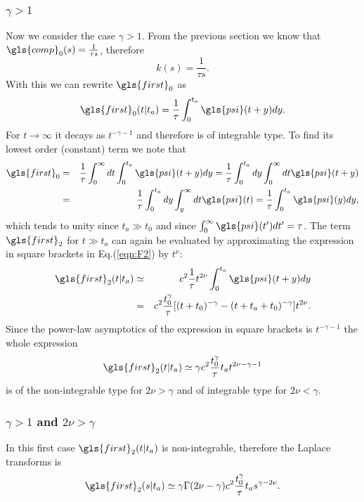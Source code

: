 \subsubsection{$\gamma > 1$}
Now we consider the case $\gamma > 1$. From the previous section we know that $\gls{comp}_0(s)=\frac{1}{\tau s}$, therefore
\begin{equation}
k(s) = \frac{1}{\tau s} . \label{eqn:kGammaLarge}
\end{equation}
With this we can rewrite $\gls{first}_0$ as 
\begin{equation}
 \gls{first}_0(t|t_a) = \frac{1}{\tau} \int_0^{t_a} \gls{psi}(t+y)dy.
\end{equation}
For $t \to \infty$ it decays as $t^{-\gamma-1}$ and therefore is of integrable type. To find its lowest order (constant) term we note that
\begin{eqnarray}
 \gls{first}_0 &=& \frac{1}{\tau} \int_0^\infty dt \int_0^{t_a} \gls{psi}(t+y)dy = \frac{1}{\tau} \int_0^{t_a} dy \int_0^\infty dt \gls{psi}(t+y) \nonumber \\
 &=& \frac{1}{\tau} \int_0^{t_a} dy \int_y^\infty dt \gls{psi}(t) = \frac{1}{\tau} \int^{t_a}_0 \gls{psi}(y) dy,
\end{eqnarray}
which tends to unity since $t_a \gg t_0$ and since $\int_0^\infty \gls{psi}(t') dt' = \tau$. 
The term $\gls{first}_2$ for $t \gg t_a$ can again be 
evaluated by approximating the expression in square brackets in Eq.(\ref{eqn:F2}) by $t^\nu$: 
\begin{eqnarray}
 \gls{first}_2(t|t_a) &\simeq & c^2  \frac{1}{\tau} t^{2\nu} \int_0^{t_a} \gls{psi}(t+y)dy \\
 &=& c^2 \frac{ t_0^\gamma }{\tau} [(t+t_0)^{-\gamma}-(t+t_a+t_0)^{-\gamma}]t^{2\nu}. \nonumber
 \label{F2lagrer1}
\end{eqnarray}
Since the power-law asymptotics of the expression in square brackets is $t^{-\gamma -1}$ the whole expression
\begin{equation}
 \gls{first}_2(t|t_a) \simeq \gamma c^2  \frac{t_0^\gamma }{\tau}t_a t^{2\nu-\gamma -1}
\end{equation}
is of the non-integrable type for $2\nu > \gamma$ and of integrable type for $2 \nu < \gamma$.

\subsubsection{$\gamma>1$ and $2\nu > \gamma$} 
In this first case $\gls{first}_2(t|t_a)$ is non-integrable, therefore the Laplace transforms is 
\begin{equation}
 \gls{first}_2(s|t_a) \simeq \gamma\Gamma (2\nu-\gamma) c^2\frac{t_0^\gamma}{\tau}t_a s^{\gamma - 2\nu}.
\end{equation}

